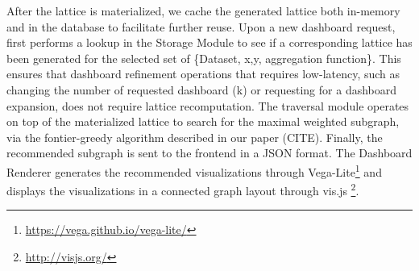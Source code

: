 After the lattice is materialized, we cache the generated lattice both in-memory and in the database to facilitate further reuse. Upon a new dashboard request, \vispilot first performs a lookup in the Storage Module to see if a corresponding lattice has been generated for the selected set of \{Dataset, x,y, aggregation function\}. This ensures that dashboard refinement operations that requires low-latency, such as changing the number of requested dashboard (k) or requesting for a dashboard expansion, does not require lattice recomputation. The traversal module operates on top of the materialized lattice to search for the maximal weighted subgraph, via the fontier-greedy algorithm described in our paper (CITE). Finally, the recommended subgraph is sent to the frontend in a JSON format. The Dashboard Renderer generates the recommended visualizations through Vega-Lite\footnote{\url{https://vega.github.io/vega-lite/}} and displays the visualizations in a connected graph layout through vis.js \footnote{\url{http://visjs.org/}}. 












